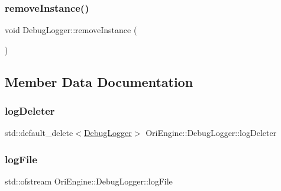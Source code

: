 \hypertarget{class_ori_engine_1_1_debug_logger_a3fd1279ac33bfd6994e74a402d304d1f}{}\label{class_ori_engine_1_1_debug_logger_a3fd1279ac33bfd6994e74a402d304d1f} 
\subsubsection{\texorpdfstring{remove\+Instance()}{removeInstance()}}
{\footnotesize\ttfamily void Debug\+Logger\+::remove\+Instance (\begin{DoxyParamCaption}{ }\end{DoxyParamCaption})}



\subsection{Member Data Documentation}
\hypertarget{class_ori_engine_1_1_debug_logger_ae86b0220c28dba347069ffd1b8d119f6}{}\label{class_ori_engine_1_1_debug_logger_ae86b0220c28dba347069ffd1b8d119f6} 
\subsubsection{\texorpdfstring{log\+Deleter}{logDeleter}}
{\footnotesize\ttfamily std\+::default\+\_\+delete$<$\hyperlink{class_ori_engine_1_1_debug_logger}{Debug\+Logger}$>$ Ori\+Engine\+::\+Debug\+Logger\+::log\+Deleter\hspace{0.3cm}{\ttfamily [private]}}

\hypertarget{class_ori_engine_1_1_debug_logger_a23007f95260fd62728a4828b9d5af54a}{}\label{class_ori_engine_1_1_debug_logger_a23007f95260fd62728a4828b9d5af54a} 
\subsubsection{\texorpdfstring{log\+File}{logFile}}
{\footnotesize\ttfamily std\+::ofstream Ori\+Engine\+::\+Debug\+Logger\+::log\+File\hspace{0.3cm}{\ttfamily [private]}}

